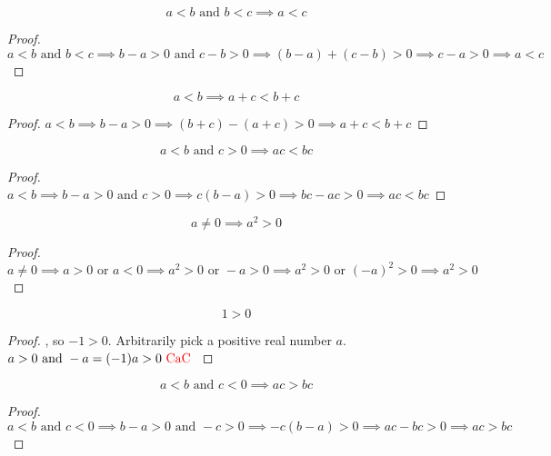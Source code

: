 \documentclass{report}
\begin{document}
\begin{theorem}
\begin{equation}
a<b\text{ and }b<c\implies a<c
\end{equation}
\end{theorem}
\begin{proof}
 $a<b\text{ and }b<c\implies b-a>0\text{ and }c-b>0\implies (b-a)+(c-b)>0\implies c-a>0\implies a<c$ 
\end{proof}
\begin{theorem}
\begin{equation}
a<b\implies a+c<b+c
\end{equation}
\end{theorem}
\begin{proof}
 $a<b\implies b-a>0\implies (b+c)-(a+c)>0\implies a+c<b+c$ 
\end{proof}
\begin{theorem}
\begin{equation}
a<b\text{ and }c>0\implies ac<bc
\end{equation}
\end{theorem}
\begin{proof}
 $a<b\implies b-a>0\text{ and }c>0\implies c(b-a)>0\implies bc-ac>0\implies ac<bc$
\end{proof}
\begin{theorem}
\begin{equation}
a\neq 0\implies a^2>0
\end{equation}
\end{theorem}
\begin{proof}
  $a\neq 0\implies a>0\text{ or }a<0\implies a^2>0\text{ or }-a>0\implies a^2>0\text{ or }(-a)^2>0\implies a^2>0$
\end{proof}
\begin{theorem}
\begin{equation}
1>0
\end{equation}
\end{theorem}
\begin{proof}
, so $-1>0$. Arbitrarily pick a positive real number $a$. $a>0\text{ and }-a=(-1)a>0\text{ \textcolor{red}{CaC} }$
\end{proof}
\begin{theorem}
\begin{equation}
a<b\text{ and }c<0\implies ac>bc
\end{equation}
\end{theorem}
\begin{proof}
 $a<b\text{ and }c<0\implies b-a>0\text{ and }-c>0\implies -c(b-a)>0\implies ac-bc>0\implies ac>bc$
\end{proof}
\end{document}
